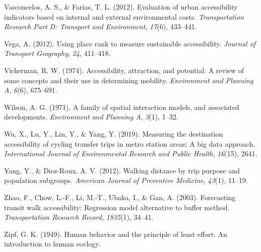 \documentclass[
11pt, %
oneside, %
english, %
singlespacing, %
]{macthesis} %
\newlength{\cslhangindent}
\newenvironment{CSLReferences}[2] %
 {%
  \setlength{\parindent}{0pt}
  \ifodd #1 \everypar{\setlength{\hangindent}{\cslhangindent}}\ignorespaces\fi
  \ifnum #2 > 0
  \setlength{\parskip}{#2\baselineskip}
  \fi
 }%
 {}
\begin{document}
\begin{CSLReferences}{1}{0}
\leavevmode{}%
Vasconcelos, A. S., \& Farias, T. L. (2012). Evaluation of urban accessibility indicators based on internal and external environmental costs. \emph{Transportation Research Part D: Transport and Environment}, \emph{17}(6), 433--441.

\leavevmode{}%
Vega, A. (2012). Using place rank to measure sustainable accessibility. \emph{Journal of Transport Geography}, \emph{24}, 411--418.

\leavevmode{}%
Vickerman, R. W. (1974). Accessibility, attraction, and potential: A review of some concepts and their use in determining mobility. \emph{Environment and Planning A}, \emph{6}(6), 675--691.

\leavevmode{}%
Wilson, A. G. (1971). A family of spatial interaction models, and associated developments. \emph{Environment and Planning A}, \emph{3}(1), 1--32.

\leavevmode{}%
Wu, X., Lu, Y., Lin, Y., \& Yang, Y. (2019). Measuring the destination accessibility of cycling transfer trips in metro station areas: A big data approach. \emph{International Journal of Environmental Research and Public Health}, \emph{16}(15), 2641.

\leavevmode{}%
Yang, Y., \& Diez-Roux, A. V. (2012). Walking distance by trip purpose and population subgroups. \emph{American Journal of Preventive Medicine}, \emph{43}(1), 11--19.

\leavevmode{}%
Zhao, F., Chow, L.-F., Li, M.-T., Ubaka, I., \& Gan, A. (2003). Forecasting transit walk accessibility: Regression model alternative to buffer method. \emph{Transportation Research Record}, \emph{1835}(1), 34--41.

\leavevmode{}%
Zipf, G. K. (1949). Human behavior and the principle of least effort: An introduction to human eoclogy.

\end{CSLReferences}
\end{document}
